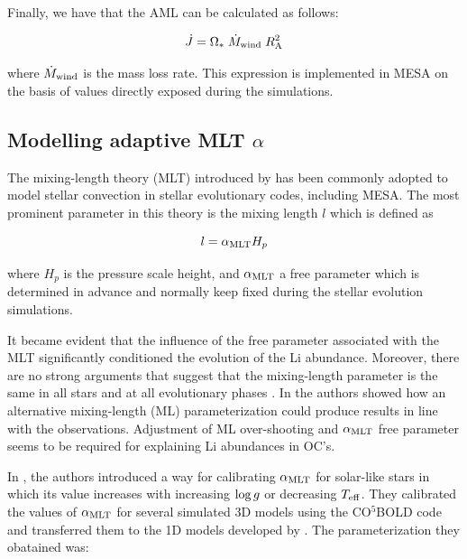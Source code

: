 \documentclass[fleqn,usenatbib]{mnras}
\begin{document}
Finally, we have that the AML can be calculated as follows:
\begin{ceqn}
\begin{equation}
 \Dot{J} = \Omega_* \; \Dot{M}_{\mathrm{wind}} \; R_{\mathrm{A}}^{2} \label{eq:j_dot}
\end{equation}
\end{ceqn}
where $\Dot{M}_{\mathrm{wind}}$ is the mass loss rate. This expression is implemented in MESA on the basis of values directly exposed during the simulations.

\subsection{Modelling adaptive MLT $\alpha$} \label{mod_mltalpha}
The mixing-length theory (MLT) introduced by \citet{BohmVit58} has been commonly adopted to model stellar convection in stellar evolutionary codes, including MESA. The most prominent parameter in this theory is the mixing length $l$ which is defined as 
\begin{ceqn}
\begin{equation}
 l = \alpha_{\mathrm{MLT}} H_p\label{eq:mixlength}
\end{equation}
\end{ceqn}
where $H_p$ is the pressure scale height, and $\alpha_{\mathrm{MLT}}$ a free parameter which is determined in advance and normally keep fixed during the stellar evolution simulations.\par

 It became evident that the influence of the free parameter associated with the MLT significantly conditioned the evolution of the Li abundance. Moreover, there are no strong arguments that suggest that the mixing-length parameter is the same in all stars and at all evolutionary phases \citep{Pasetto2014}. In \citet{Caballero2020} the authors showed how an alternative mixing-length (ML) parameterization could produce results in line with the observations. Adjustment of ML over-shooting and $\alpha_{\mathrm{MLT}}$ free parameter seems to be required for explaining Li abundances in OC's.\par

In \citet{Sonoi2018}, the authors introduced a way for calibrating $\alpha_{\mathrm{MLT}}$ for solar-like stars in which its value increases with increasing $\mathrm{log} \, g$ or decreasing $T_{\mathrm{eff}}$. They calibrated the values of $\alpha_{\mathrm{MLT}}$ for several simulated 3D models using the CO$^5$BOLD code \citep{Freytag2011} and transferred them to the 1D models developed by \citet{Ludwig1998}. The parameterization they obatained was: 
\end{document}
